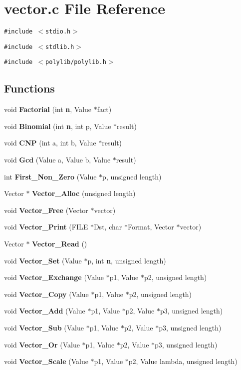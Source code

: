 \section{vector.c File Reference}
\label{vector_8c}
{\tt \#include $<$stdio.h$>$}\par
{\tt \#include $<$stdlib.h$>$}\par
{\tt \#include $<$polylib/polylib.h$>$}\par
\subsection*{Functions}
\begin{CompactItemize}
\item 
void {\bf Factorial} (int {\bf n}, Value $\ast$fact)
\item 
void {\bf Binomial} (int {\bf n}, int p, Value $\ast$result)
\item 
void {\bf CNP} (int a, int b, Value $\ast$result)
\item 
void {\bf Gcd} (Value a, Value b, Value $\ast$result)
\item 
int {\bf First\_\-Non\_\-Zero} (Value $\ast$p, unsigned length)
\item 
Vector $\ast$ {\bf Vector\_\-Alloc} (unsigned length)
\item 
void {\bf Vector\_\-Free} (Vector $\ast$vector)
\item 
void {\bf Vector\_\-Print} (FILE $\ast$Dst, char $\ast$Format, Vector $\ast$vector)
\item 
Vector $\ast$ {\bf Vector\_\-Read} ()
\item 
void {\bf Vector\_\-Set} (Value $\ast$p, int {\bf n}, unsigned length)
\item 
void {\bf Vector\_\-Exchange} (Value $\ast$p1, Value $\ast$p2, unsigned length)
\item 
void {\bf Vector\_\-Copy} (Value $\ast$p1, Value $\ast$p2, unsigned length)
\item 
void {\bf Vector\_\-Add} (Value $\ast$p1, Value $\ast$p2, Value $\ast$p3, unsigned length)
\item 
void {\bf Vector\_\-Sub} (Value $\ast$p1, Value $\ast$p2, Value $\ast$p3, unsigned length)
\item 
void {\bf Vector\_\-Or} (Value $\ast$p1, Value $\ast$p2, Value $\ast$p3, unsigned length)
\item 
void {\bf Vector\_\-Scale} (Value $\ast$p1, Value $\ast$p2, Value lambda, unsigned length)
\item 

\end{CompactItemize}
